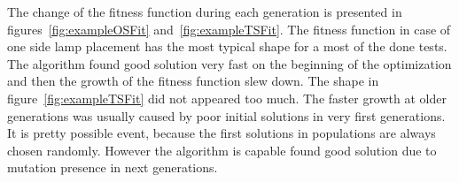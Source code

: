 The change of the fitness function during each generation is  presented in figures~\ref{fig:exampleOSFit} and~\ref{fig:exampleTSFit}. The fitness function in case of one side lamp placement has the most typical shape for a most of the done tests. The algorithm found good solution very fast on the beginning of the optimization and then the growth of the fitness function slew down. The shape in figure~\ref{fig:exampleTSFit} did not appeared too much. The faster growth at older generations was usually caused by poor initial solutions in very first generations. It is pretty possible event, because the first solutions in populations are always chosen randomly. However the algorithm is capable found good solution due to mutation presence in next generations.


\begin{figure}[t]
        \centering
        \\
        \\

\end{figure}
